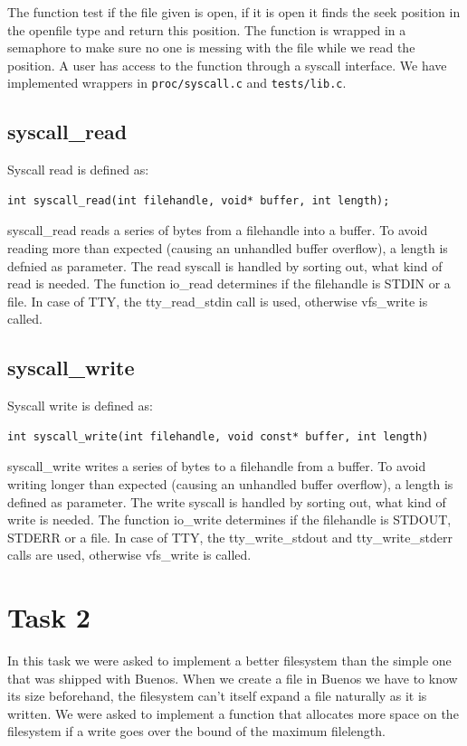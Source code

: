 \documentclass[11pt]{article}
\begin{document}
The function test if the file given is open, if it is open it finds the seek
position in the openfile type and return this position.  The function is
wrapped in a semaphore to make sure no one is messing with the file while we
read the position.  A user has access to the function through a syscall
interface.  We have implemented wrappers in \texttt{proc/syscall.c} and
\texttt{tests/lib.c}.

\subsection{syscall\_read}
Syscall read is defined as:
    \begin{lstlisting}[style=customc]
int syscall_read(int filehandle, void* buffer, int length);
    \end{lstlisting}

syscall\_read reads a series of bytes from a filehandle into a buffer. To avoid reading more than expected (causing an unhandled buffer overflow), a length is defnied as parameter.
The read syscall is handled by sorting out, what kind of read is needed. The function io\_read determines if the filehandle is STDIN or a file. In case of TTY, the tty\_read\_stdin call is used, otherwise vfs\_write is called.

\subsection{syscall\_write}
Syscall write is defined as:
    \begin{lstlisting}[style=customc]
int syscall_write(int filehandle, void const* buffer, int length)
    \end{lstlisting}
syscall\_write writes a series of bytes to a filehandle from a buffer. To avoid writing longer than expected (causing an unhandled buffer overflow), a length is defined as parameter.
The write syscall is handled by sorting out, what kind of write is needed. The function io\_write determines if the filehandle is STDOUT, STDERR or a file. In case of TTY, the tty\_write\_stdout and tty\_write\_stderr calls are used, otherwise vfs\_write is called.


\section{Task 2}
In this task we were asked to implement a better filesystem than the simple one
that was shipped with Buenos.  When we create a file in Buenos we have to know
its size beforehand, the filesystem can't itself expand a file naturally as it
is written.  We were asked to implement a function that allocates more space on
the filesystem if a write goes over the bound of the maximum filelength.
\end{document}

